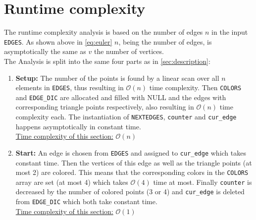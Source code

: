\documentclass[english]{scrartcl}
\newcommand{\code}{\texttt}
\begin{document}
\section{Runtime complexity}
\label{sec:runtime_comp}
The runtime complexity analysis is based on the number of edges $n$ in the input \code{EDGES}. As shown above in \autoref{eq:euler} $n$, being the number of edges, is asymptotically the same as $v$ the number of vertices.\\
The Analysis is split into the same four parts as in \autoref{sec:description}:
\begin{enumerate}
    \item \textbf{Setup:} The number of the points is found by a linear scan over all $n$ elements in \code{EDGES}, thus resulting in $\mathcal{O}(n)$ time complexity. Then \code{COLORS} and \code{EDGE\_DIC} are allocated and filled with NULL and the edges with corresponding triangle points respectively, also resulting in $\mathcal{O}(n)$ time complexity each. The instantiation of \code{NEXTEDGES}, \code{counter} and \code{cur\_edge} happens asymptotically in constant time. \\ \underline{Time complexity of this section:} $\mathcal{O}(n)$
    \item \textbf{Start:} An edge is chosen from \code{EDGES} and assigned to \code{cur\_edge} which takes constant time. Then the vertices of this edge as well as the triangle points (at most 2) are colored. This means that the corresponding colors in the \code{COLORS} array are set (at most 4) which takes $\mathcal{O}(4)$ time at most. Finally \code{counter} is decreased by the number of colored points (3 or 4) and \code{cur\_edge} is deleted from \code{EDGE\_DIC} which both take constant time.  \\ \underline{Time complexity of this section:} $\mathcal{O}(1)$

\end{enumerate}
\end{document}
